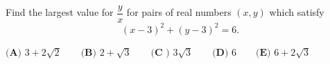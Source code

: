 Find the largest value for $\dfrac{y}{x}$ for pairs of real numbers $(x,y)$ which satisfy \[(x-3)^2 + (y-3)^2 = 6.\]

$\textbf{(A) }3 + 2 \sqrt 2\qquad
\textbf{(B) } 2 + \sqrt 3\qquad
\textbf{(C ) }3 \sqrt 3\qquad
\textbf{(D) }6\qquad
\textbf{(E) }6 + 2 \sqrt 3$
